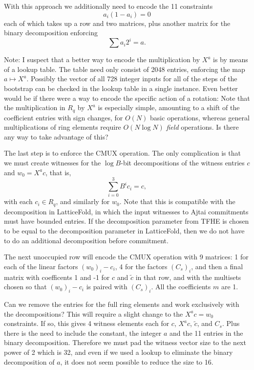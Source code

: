 \documentclass{article}
\begin{document}
With this approach we additionally need to encode the 11 constraints
\begin{equation}
    a_i (1-a_i) = 0
\end{equation}
each of which takes up a row and two matrices, plus another matrix for the binary decomposition enforcing
\begin{equation}
    \sum a_i 2^i = a.
\end{equation}

Note: I suspect that a better way to encode the multiplication by $X^a$ is by means of a lookup table. The table need only consist of 2048 entries, enforcing the map $a \mapsto X^a$. Possibly the vector of all 728 integer inputs for all of the steps of the bootstrap can be checked in the lookup table in a single instance. Even better would be if there were a way to encode the specific action of a rotation: Note that the multiplication in $R_q$ by $X^a$ is especially simple, amounting to a shift of the coefficient entries with sign changes, for $O(N)$ basic operations, whereas general multiplications of ring elements require $O(N \log N)$ \emph{field} operations. Is there any way to take advantage of this?

The last step is to enforce the CMUX operation. The only complication is that we must create witnesses for the $\log B$-bit decompositions of the witness entries $c$ and $w_0 = X^a c$, that is,
\begin{equation}
    \sum_{i=0}^3 B^i c_i = c,
\end{equation}
with each $c_i \in R_q$, and similarly for $w_0$. Note that this is compatible with the decomposition in LatticeFold, in which the input witnesses to Ajtai commitments must have bounded entries. If the decomposition parameter from TFHE is chosen to be equal to the decomposition parameter in LatticeFold, then we do not have to do an additional decomposition before commitment.

The next unoccupied row will encode the CMUX operation with 9 matrices: 1 for each of the linear factors $(w_0)_i - c_i$, 4 for the factors $(C_s)_i$, and then a final matrix with coefficents 1 and -1 for $c$ and $\tilde{c}$ in that row, and with the multisets chosen so that $(w_0)_i - c_i$ is paired with $(C_s)_i$. All the coefficients $m$ are 1.

Can we remove the entries for the full ring elements and work exclusively with the decompositions? This will require a slight change to the $X^ac = w_0$ constraints. If so, this gives 4 witness elements each for $c$, $X^ac$, $\tilde{c}$, and $C_s$. Plus there is the need to include the constant, the integer $a$ and the 11 entries in the binary decomposition. Therefore we must pad the witness vector size to the next power of 2 which is 32, and even if we used a lookup to eliminate the binary decomposition of $a$, it does not seem possible to reduce the size to 16.
\end{document}

